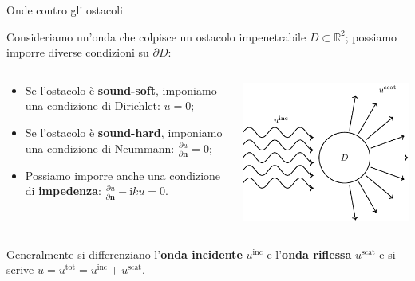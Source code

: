 \documentclass{beamer}
\newcommand{\IR}{{\mathbb R}}
\newcommand{\bn}{{\mathbf n}}
\newcommand{\inc}{{\mathrm{inc}}}
\newcommand{\tot}{{\mathrm{tot}}}
\newcommand{\scat}{{\mathrm{scat}}}
\newcommand{\ri}{{\mathrm i}}
\begin{document}
	\begin{frame}{Onde contro gli ostacoli}
		\begin{small}
			Consideriamo un'onda che colpisce un ostacolo impenetrabile $D \subset \IR^2$; possiamo imporre diverse condizioni su $\partial D$:
			\begin{columns}
				\begin{column}{0.6\textwidth}
					\begin{block}{}
						\begin{itemize}
							\item Se l'ostacolo è \textbf{sound-soft}, imponiamo una condizione di Dirichlet: $u=0$;
							\item Se l'ostacolo è \textbf{sound-hard}, imponiamo una condizione di Neummann: $\frac{\partial u}{\partial \bn}=0$;
							\item Possiamo imporre anche una condizione di \textbf{impedenza}: $\frac{\partial u}{\partial \bn} - \ri k u=0$.
						\end{itemize}
					\end{block}
	
				\end{column}
				\begin{column}{0.4\textwidth}
					\begin{center}
						\includegraphics[width=\textwidth]{figs/scat.pdf}      
					\end{center}
				\end{column}
			\end{columns}
			\vspace*{0.5cm}
			Generalmente si differenziano l'\textbf{onda incidente} $u^\inc$ e l'\textbf{onda riflessa} $u^\scat$ e si scrive $u=u^\tot=u^\inc+u^\scat$.		
		\end{small}
	\end{frame}
	
\end{document}
